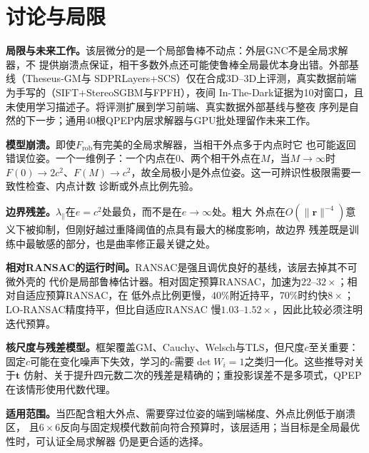 \section{讨论与局限}
\label{sec:discussion}

\noindent\textbf{局限与未来工作。}该层微分的是一个局部鲁棒不动点：外层GNC不是全局求解器，不
提供崩溃点保证，相干多数外点还可能使鲁棒全局最优本身出错。外部基线（Theseus-GM与
SDPRLayers+SCS）仅在合成3D--3D上评测，真实数据前端为手写的（SIFT+StereoSGBM与FPFH），夜间
In-The-Dark证据为10对窗口，且未使用学习描述子。将评测扩展到学习前端、真实数据外部基线与整夜
序列是自然的下一步；通用40根QPEP内层求解器与GPU批处理留作未来工作。

\noindent\textbf{模型崩溃。}即使$F_{\mathrm{rob}}$有完美的全局求解器，当相干外点多于内点时它
也可能返回错误位姿。一个一维例子：一个内点在$0$、两个相干外点在$M$，当$M\to\infty$时
$F(0)\to2c^2$、$F(M)\to c^2$，故全局极小是外点位姿。这一可辨识性极限需要一致性检查、内点计数
诊断或外点比例先验。

\noindent\textbf{边界残差。}$\lambda_\parallel$在$e=c^2$处最负，而不是在$e\to\infty$处。粗大
外点在$O(\|\mathbf{r}\|^{-4})$意义下被抑制，但刚好越过重降阈值的点具有最大的梯度影响，故边界
残差既是训练中最敏感的部分，也是曲率修正最关键之处。

\noindent\textbf{相对RANSAC的运行时间。}RANSAC是强且调优良好的基线，该层去掉其不可微外壳的
代价是局部鲁棒估计器。相对固定预算RANSAC，加速为$22$--$32\times$；相对自适应预算RANSAC，在
低外点比例更慢，$40\%$附近持平，$70\%$时约快$8\times$；LO-RANSAC精度持平，但比自适应RANSAC
慢$1.03$--$1.52\times$，因此比较必须注明迭代预算。

\noindent\textbf{核尺度与残差模型。}框架覆盖GM、Cauchy、Welsch与TLS，但尺度$c$至关重要：
固定$c$可能在变化噪声下失效，学习的$c$需要$\det W_i=1$之类归一化。这些推导对关于$\mathbf{t}$
仿射、关于提升四元数二次的残差是精确的；重投影误差不是多项式，QPEP在该情形使用代数代理。

\noindent\textbf{适用范围。}当匹配含粗大外点、需要穿过位姿的端到端梯度、外点比例低于崩溃区，
且$6\times6$反向与固定规模代数前向符合预算时，该层适用；当目标是全局最优性时，可认证全局求解器
仍是更合适的选择。
